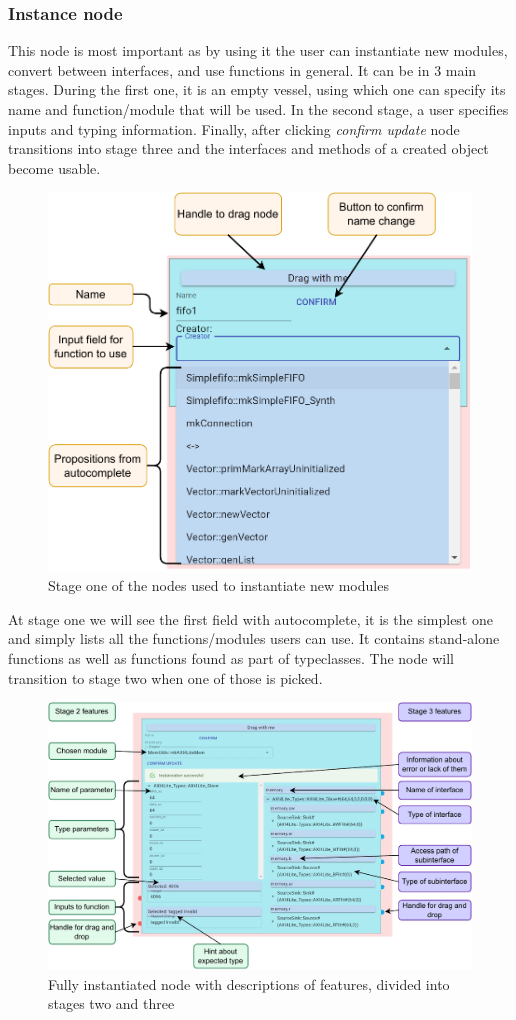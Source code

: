 \documentclass[12pt]{report}
\begin{document}
\subsubsection{Instance node} 
This node is most important as by using it the user can instantiate new modules, convert between interfaces, and use functions in general. It can be in 3 main stages. During the first one, it is an empty vessel, using which one can specify its name and function/module that will be used. In the second stage, a user specifies inputs and typing information. Finally, after clicking \emph{confirm update} node transitions into stage three and the interfaces and methods of a created object become usable. 
\newpage 
\begin{figure}[!h] 
   \centering 
    
   \includegraphics[width=0.63\columnwidth]{pdfExports/LargeMapInstanceNode.pdf} 
   \caption{Stage one of the nodes used to instantiate new modules} 
\end{figure} 
At stage one we will see the first field with autocomplete, it is the simplest one and simply lists all the functions/modules users can use. It contains stand-alone functions as well as functions found as part of typeclasses. The node will transition to stage two when one of those is picked. 
\begin{figure}[H] 
   \centering 
   \includegraphics[width=1\columnwidth]{pdfExports/LargeMap-InstanceNodePart2.drawio.pdf} 
   \caption{Fully instantiated node with descriptions of features, divided into stages two and three} 
\end{figure} 
\end{document}
